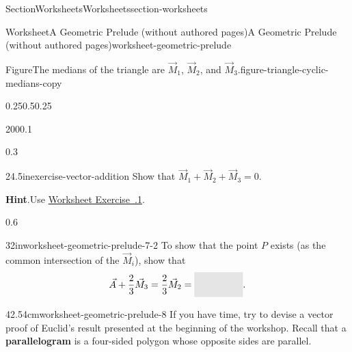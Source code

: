 \documentclass[oneside,10pt,]{article}
\newcommand{\blocktitlefont}{\relax}
\newcommand{\xreffont}{\relax}
\newcommand{\ptxterminology}[1]{\textbf{#1}}
\newcommand{\fillinmath}[1]{\mathchoice{\colorbox{fillinmathshade}{$\displaystyle     \phantom{\,#1\,}$}}{\colorbox{fillinmathshade}{$\textstyle        \phantom{\,#1\,}$}}{\colorbox{fillinmathshade}{$\scriptstyle      \phantom{\,#1\,}$}}{\colorbox{fillinmathshade}{$\scriptscriptstyle\phantom{\,#1\,}$}}}
\numberwithin{equation}{section}
\begin{document}
\begin{sectionptx}{Section}{Worksheets}{}{Worksheets}{}{}{section-worksheets}
\begin{worksheet-subsection}{Worksheet}{A Geometric Prelude (without authored pages)}{}{A Geometric Prelude (without authored pages)}{}{}{worksheet-geometric-prelude}
\begin{figureptx}{Figure}{The medians of the triangle are \(\vec{M}_1\), \(\vec{M}_2\), and \(\vec{M}_3\).}{figure-triangle-cyclic-medians-copy}{}
\begin{image}{0.25}{0.5}{0.25}{}
{%
}%
\end{image}%
\tcblower
\end{figureptx}%
\begin{sidebyside}{2}{0}{0}{0.1}%
\begin{sbspanel}{0.3}%
\begin{divisionexercise}{2}{}{4.5in}{exercise-vector-addition}%
Show that \(\vec{M}_{1} + \vec{M}_{2} + \vec{M}_{3} = 0\).%
\par\smallskip%
\noindent\textbf{\blocktitlefont Hint}.\hypertarget{exercise-vector-addition-2}{}\quad{}Use \hyperlink{ex-cyclic}{Worksheet Exercise~{\xreffont 1.1.1}}.%
\end{divisionexercise}%
\end{sbspanel}%
\begin{sbspanel}{0.6}%
\begin{divisionexercise}{3}{}{2in}{worksheet-geometric-prelude-7-2}%
To show that the point \(P\) exists (as the common intersection of the \(\vec{M}_{i}\)), show that%
\begin{equation*}
\vec{A} + \frac{2}{3} \vec{M}_{3} = \frac{2}{3} \vec{M}_{2} = \fillinmath{\frac{2}{3} \vec{M}_{1}-\vec{C}}\text{.}
\end{equation*}
%
\end{divisionexercise}%
\end{sbspanel}%
\end{sidebyside}%
\begin{divisionexercise}{4}{}{2.54cm}{worksheet-geometric-prelude-8}%
If you have time, try to devise a vector proof of Euclid's result presented at the beginning of the workshop. Recall that a \ptxterminology{parallelogram} is a four-sided polygon whose opposite sides are parallel.%
\end{divisionexercise}%

\end{worksheet-subsection}
\end{sectionptx}
\end{document}
